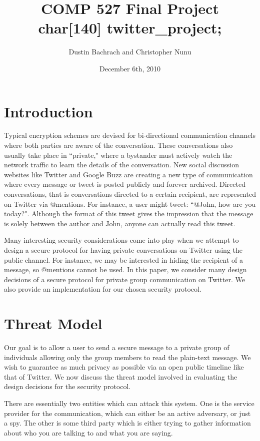 \documentclass{article}
\begin{document}
	
\author{Dustin Bachrach and Christopher Nunu}
\title{COMP 527 Final Project\\char[140] twitter\_project;}
\date{December 6th, 2010}
\maketitle

\section*{Introduction}

Typical encryption schemes are devised for bi-directional communication channels where both parties are aware of the conversation. These conversations also usually take place in ``private," where a bystander must actively watch the network traffic to learn the details of the conversation. New social discussion websites like Twitter and Google Buzz are creating a new type of communication where every message or tweet is posted publicly and forever archived. Directed conversations, that is conversations directed to a certain recipient, are represented on Twitter via @mentions. For instance, a user might tweet: ``@John, how are you today?". Although the format of this tweet gives the impression that the message is solely between the author and John, anyone can actually read this tweet.

Many interesting security considerations come into play when we attempt to design a secure protocol for having private conversations on Twitter using the public channel. For instance, we may be interested in hiding the recipient of a message, so @mentions cannot be used. In this paper, we consider many design decisions of a secure protocol for private group communication on Twitter. We also provide an implementation for our chosen security protocol.

\section*{Threat Model}

Our goal is to allow a user to send a secure message to a private group of individuals allowing only the group members to read the plain-text message. We wish to guarantee as much privacy as possible via an open public timeline like that of Twitter. We now discuss the threat model involved in evaluating the design decisions for the security protocol.

There are essentially two entities which can attack this system. One is the service provider for the communication, which can either be an active adversary, or just a spy. The other is some third party which is either trying to gather information about who you are talking to and what you are saying.
 
\end{document}

